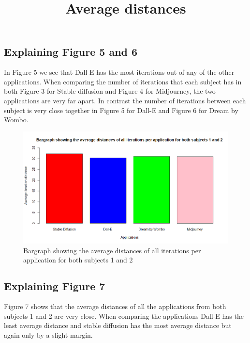 \documentclass[]{report}
\begin{document}
	\pagebreak
	\subsection{Explaining Figure 5 and 6}
	
	In Figure 5 we see that Dall-E has the most iterations out of any of the other applications. When comparing the number of iterations that each subject has in both Figure 3 for Stable diffusion and Figure 4 for Midjourney, the two applications are very far apart. In contrast the number of iterations between each subject is very close together in Figure 5 for Dall-E and Figure 6 for Dream by Wombo.
	
	
	
	\begin{figure}[!htbp]
		\centering
		\bfseries
		\title{Average distances}
		\includegraphics[width=1\linewidth, trim=0 0 0 50, clip]{Bargraph}
		\caption{Bargraph showing the average distances of all iterations per application for both subjects 1 and 2}
		\label{fig:bargraph}
	\end{figure}
	
	\subsection{Explaining Figure 7}
	Figure 7 shows that the average distances of all the applications from both subjects 1 and 2 are very close. When comparing the applications Dall-E has the least average distance and stable diffusion has the most average distance but again only by a slight margin. 
	
\end{document}
